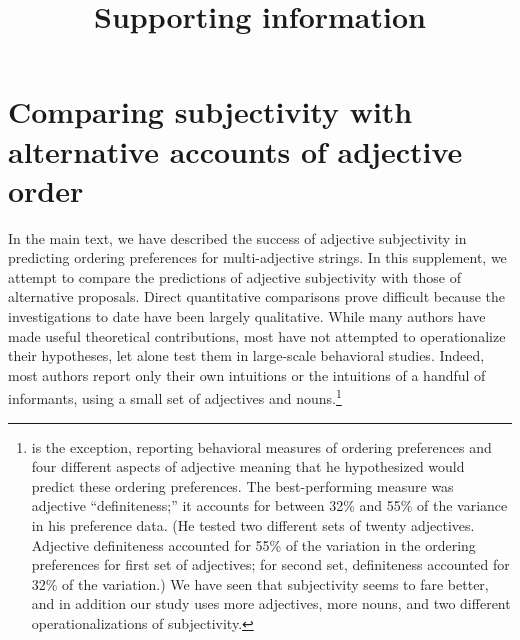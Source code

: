 \documentclass[12pt]{article}
\title{Supporting information}
\date{}
\begin{document}
\maketitle

\appendix

\section{Comparing subjectivity with alternative accounts of adjective order}

In the main text, we have described the success of adjective subjectivity in predicting ordering preferences for multi-adjective strings. In this supplement, we attempt to compare the predictions of adjective subjectivity with those of alternative proposals. Direct quantitative comparisons prove difficult because the investigations to date have been largely qualitative. 
While many authors have made useful theoretical contributions,
most have not attempted to operationalize their hypotheses, let alone test them in large-scale behavioral studies.
Indeed, most authors report only their own intuitions or the intuitions of a handful of informants, using a small set of adjectives and nouns.\footnote{\citet{martin1969} is the exception, reporting behavioral measures of ordering preferences and four different aspects of adjective meaning that he hypothesized would predict these ordering preferences. The best-performing measure was adjective ``definiteness;'' it accounts for between 32\% and 55\% of the variance in his preference data. (He tested two different sets of twenty adjectives. Adjective definiteness accounted for 55\% of the variation in the ordering preferences for first set of adjectives; for second set, definiteness accounted for 32\% of the variation.) We have seen that subjectivity seems to fare better, and in addition our study uses more adjectives, more nouns, and two different operationalizations of subjectivity.} 
\end{document}
